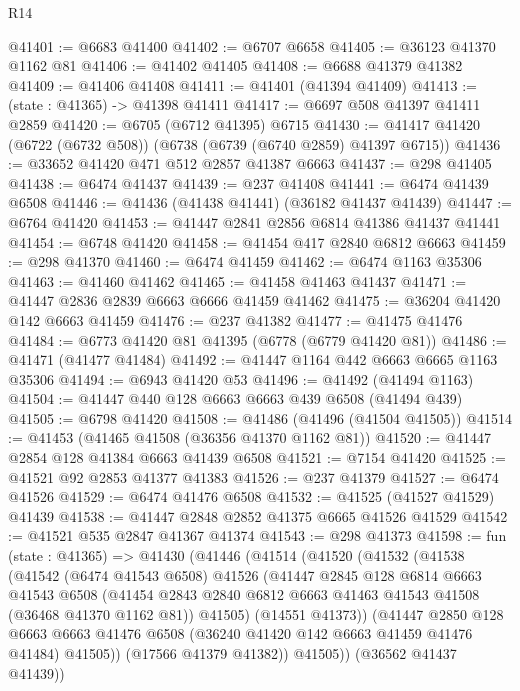 \begin{lexlean}{R14}
\begin{coremodule}
@41401 := @6683 @41400
@41402 := @6707 @6658
@41405 := @36123 @41370 @1162 @81
@41406 := @41402 @41405
@41408 := @6688 @41379 @41382
@41409 := @41406 @41408
@41411 := @41401 (@41394 @41409)
@41413 := (state : @41365) -> @41398 @41411
@41417 := @6697 @508 @41397 @41411 @2859
@41420 := @6705 (@6712 @41395) @6715
@41430 := @41417 @41420 (@6722 (@6732 @508)) (@6738 (@6739 (@6740 @2859) @41397 @6715))
@41436 := @33652 @41420 @471 @512 @2857 @41387 @6663
@41437 := @298 @41405
@41438 := @6474 @41437
@41439 := @237 @41408
@41441 := @6474 @41439 @6508
@41446 := @41436 (@41438 @41441) (@36182 @41437 @41439)
@41447 := @6764 @41420
@41453 := @41447 @2841 @2856 @6814 @41386 @41437 @41441
@41454 := @6748 @41420
@41458 := @41454 @417 @2840 @6812 @6663
@41459 := @298 @41370
@41460 := @6474 @41459
@41462 := @6474 @1163 @35306
@41463 := @41460 @41462
@41465 := @41458 @41463 @41437
@41471 := @41447 @2836 @2839 @6663 @6666 @41459 @41462
@41475 := @36204 @41420 @142 @6663 @41459
@41476 := @237 @41382
@41477 := @41475 @41476
@41484 := @6773 @41420 @81 @41395 (@6778 (@6779 @41420 @81))
@41486 := @41471 (@41477 @41484)
@41492 := @41447 @1164 @442 @6663 @6665 @1163 @35306
@41494 := @6943 @41420 @53
@41496 := @41492 (@41494 @1163)
@41504 := @41447 @440 @128 @6663 @6663 @439 @6508 (@41494 @439)
@41505 := @6798 @41420
@41508 := @41486 (@41496 (@41504 @41505))
@41514 := @41453 (@41465 @41508 (@36356 @41370 @1162 @81))
@41520 := @41447 @2854 @128 @41384 @6663 @41439 @6508
@41521 := @7154 @41420
@41525 := @41521 @92 @2853 @41377 @41383
@41526 := @237 @41379
@41527 := @6474 @41526
@41529 := @6474 @41476 @6508
@41532 := @41525 (@41527 @41529) @41439
@41538 := @41447 @2848 @2852 @41375 @6665 @41526 @41529
@41542 := @41521 @535 @2847 @41367 @41374
@41543 := @298 @41373
@41598 := fun (state : @41365) =>
  @41430
    (@41446
      (@41514
        (@41520
          (@41532
            (@41538
              (@41542
                (@6474 @41543 @6508)
                @41526
                (@41447
                  @2845
                  @128
                  @6814
                  @6663
                  @41543
                  @6508
                  (@41454 @2843 @2840 @6812 @6663 @41463 @41543 @41508 (@36468 @41370 @1162 @81))
                  @41505)
                (@14551 @41373))
              (@41447
                @2850
                @128
                @6663
                @6663
                @41476
                @6508
                (@36240 @41420 @142 @6663 @41459 @41476 @41484)
                @41505))
            (@17566 @41379 @41382))
          @41505))
      (@36562 @41437 @41439))

\end{coremodule}
\end{lexlean}

